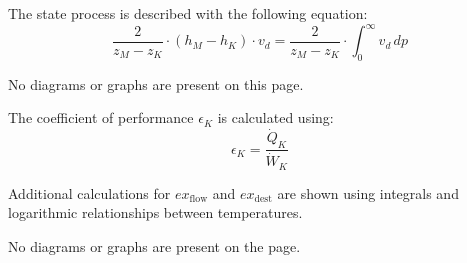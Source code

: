The state process is described with the following equation:  
\[
\frac{2}{z_M - z_K} \cdot \left( h_M - h_K \right) \cdot v_d = \frac{2}{z_M - z_K} \cdot \int_{0}^{\infty} v_d \, dp
\]  

No diagrams or graphs are present on this page.

The coefficient of performance \( \epsilon_K \) is calculated using:  
\[
\epsilon_K = \frac{\dot{Q}_K}{\dot{W}_K}
\]

Additional calculations for \( ex_{\text{flow}} \) and \( ex_{\text{dest}} \) are shown using integrals and logarithmic relationships between temperatures.  

No diagrams or graphs are present on the page.
